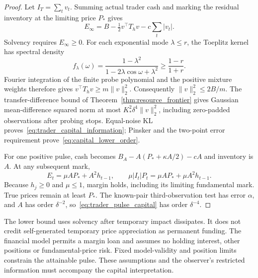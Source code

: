 \begin{proof}
Let $I_T=\sum_t v_t$. Summing actual trader cash and marking the residual inventory at the limiting price $P_*$ gives
\[
E_\infty=B-\tfrac12v^\top T_hv-c\sum_t|v_t|.
\]
Solvency requires $E_\infty\ge0$. For each exponential mode $\lambda\le r$, the Toeplitz kernel has spectral density
\[
f_\lambda(\omega)=\frac{1-\lambda^2}{1-2\lambda\cos\omega+\lambda^2}
\ge\frac{1-r}{1+r}.
\]
Fourier integration of the finite probe polynomial and the positive mixture weights therefore gives
$v^\top T_hv\ge m\|v\|_2^2$.
Consequently $\|v\|_2^2\le2B/m$.
The transfer-difference bound of Theorem~\ref{thm:resource_frontier} gives Gaussian mean-difference squared norm at most $K_*^2\delta^4\|v\|_2^2$, including zero-padded observations after probing stops. Equal-noise KL proves~\eqref{eq:trader_capital_information}; Pinsker and the two-point error requirement prove~\eqref{eq:capital_lower_order}.

For one positive pulse, cash becomes $B_A-A(P_*+\kappa A/2)-cA$ and inventory is $A$. At any subsequent mark,
\[
E_t=\mu A P_*+A^2h_{t-1},\qquad
\mu|I_t|P_t=\mu A P_*+\mu A^2h_{t-1}.
\]
Because $h_j\ge0$ and $\mu\le1$, margin holds, including its limiting fundamental mark. True prices remain at least $P_*$. The known-pair third-observation test has error $\alpha$, and $A$ has order $\delta^{-2}$, so~\eqref{eq:trader_pulse_capital} has order $\delta^{-4}$.
\end{proof}

The lower bound uses solvency after temporary impact dissipates. It does not credit self-generated temporary price appreciation as permanent funding. The financial model permits a margin loan and assumes no holding interest, other positions or fundamental-price risk. Fixed model-validity and position limits constrain the attainable pulse. These assumptions and the observer's restricted information must accompany the capital interpretation.
